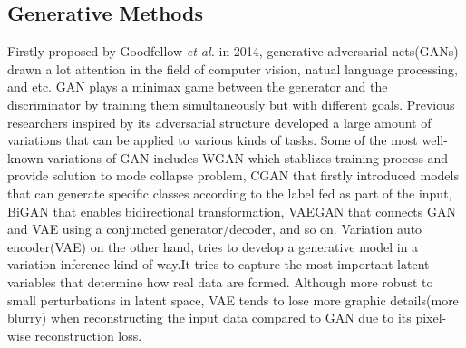 \documentclass[10pt,twocolumn,letterpaper]{article}
\begin{document}
\subsection{Generative Methods}
Firstly proposed by Goodfellow \emph{et al.} in 2014, generative adversarial nets(GANs) \cite{goodfellow2014generative} drawn a lot attention in the field of computer vision, natual language processing, and etc. GAN plays a minimax game between the generator and the discriminator by training them simultaneously but with different goals. Previous researchers inspired by its adversarial structure developed a large amount of variations that can be applied to various kinds of tasks. Some of the most well-known variations of GAN includes WGAN\cite{arjovsky2017wasserstein} which stablizes training process and provide solution to mode collapse problem, CGAN\cite{mirza2014conditional} that firstly introduced models that can generate specific classes according to the label fed as part of the input, BiGAN\cite{donahue2016adversarial} that enables bidirectional transformation, VAEGAN\cite{larsen2015autoencoding} that connects GAN and VAE using a conjuncted generator/decoder, and so on. Variation auto encoder(VAE) on the other hand, tries to develop a generative model in a variation inference kind of way\cite{kingma2013auto}.It tries to capture the most important latent variables that determine how real data are formed. Although more robust to small perturbations in latent space, VAE tends to lose more graphic details(more blurry) when reconstructing the input data compared to GAN due to its pixel-wise reconstruction loss. 
\end{document}
